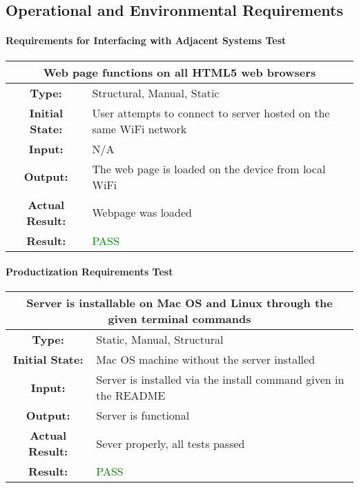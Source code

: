 \documentclass[12pt, titlepage]{article}
\begin{document}
\subsection{Operational and Environmental Requirements}

\paragraph{Requirements for Interfacing with Adjacent Systems Test}
\begin{center}
\begin{table}[H]
\begin{tabularx}{\textwidth}{| c X |}
\hline
\multicolumn{2}{|c|}{\textbf{Web page functions on all HTML5 web browsers}}\\
\hline
\textbf{Type: } & Structural, Manual, Static\\
\textbf{Initial State: } & User attempts to connect to server hosted on the same WiFi network\\
\textbf{Input: } & N/A\\
\textbf{Output: } & The web page is loaded on the device from local WiFi \\
\textbf{Actual Result:  } & Webpage was loaded \\
\textbf{Result: } & \textcolor{green}{PASS}\\
\hline
\end{tabularx}
\end{table}
\end{center}
\paragraph{Productization Requirements Test}

\begin{table}[H]
\begin{tabularx}{\textwidth}{| c X |}
\hline
\multicolumn{2}{|c|}{\textbf{Server is installable on Mac OS and Linux through the given terminal commands}}\\
\hline
\textbf{Type: } & Static, Manual, Structural\\
\textbf{Initial State: } & Mac OS machine without the server installed\\
\textbf{Input: } & Server is installed via the install command given in the README\\
\textbf{Output: } & Server is functional \\
\textbf{Actual Result:  } & Sever properly, all tests passed \\
\textbf{Result: } & \textcolor{green}{PASS}\\
\hline
\end{tabularx}
\end{table}
\end{document}
